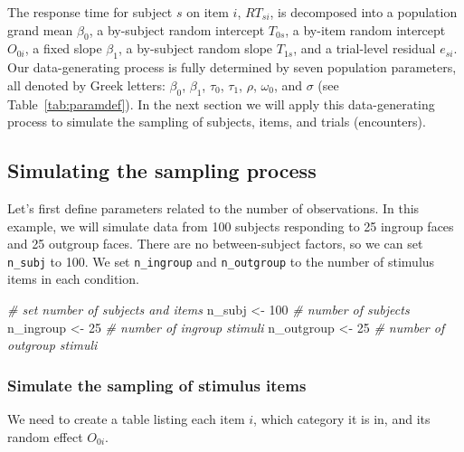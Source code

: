 \documentclass[
  english,
  doc,floatsintext]{apa6}
\newenvironment{Shaded}{\begin{snugshade}}{\end{snugshade}}
\newcommand{\CommentTok}[1]{\textcolor[rgb]{0.56,0.35,0.01}{\textit{#1}}}
\newcommand{\DecValTok}[1]{\textcolor[rgb]{0.00,0.00,0.81}{#1}}
\newcommand{\NormalTok}[1]{#1}
\newcommand{\StringTok}[1]{\textcolor[rgb]{0.31,0.60,0.02}{#1}}
\begin{document}
\noindent The response time for subject \(s\) on item \(i\), \(RT_{si}\), is decomposed into a population grand mean \(\beta_0\), a by-subject random intercept \(T_{0s}\), a by-item random intercept \(O_{0i}\), a fixed slope \(\beta_1\), a by-subject random slope \(T_{1s}\), and a trial-level residual \(e_{si}\). Our data-generating process is fully determined by seven population parameters, all denoted by Greek letters: \(\beta_0\), \(\beta_1\), \(\tau_0\), \(\tau_1\), \(\rho\), \(\omega_0\), and \(\sigma\) (see Table~\ref{tab:paramdef}). In the next section we will apply this data-generating process to simulate the sampling of subjects, items, and trials (encounters).

\hypertarget{simulating-the-sampling-process}{%
\subsection{Simulating the sampling process}\label{simulating-the-sampling-process}}

Let's first define parameters related to the number of observations. In this example, we will simulate data from 100 subjects responding to 25 ingroup faces and 25 outgroup faces. There are no between-subject factors, so we can set \texttt{n\_subj} to 100. We set \texttt{n\_ingroup} and \texttt{n\_outgroup} to the number of stimulus items in each condition.

\begin{Shaded}
\begin{Highlighting}[]
\CommentTok{# set number of subjects and items}
\NormalTok{n_subj     <-}\StringTok{ }\DecValTok{100} \CommentTok{# number of subjects}
\NormalTok{n_ingroup  <-}\StringTok{  }\DecValTok{25} \CommentTok{# number of ingroup stimuli}
\NormalTok{n_outgroup <-}\StringTok{  }\DecValTok{25} \CommentTok{# number of outgroup stimuli}
\end{Highlighting}
\end{Shaded}

\hypertarget{simulate-the-sampling-of-stimulus-items}{%
\subsubsection{Simulate the sampling of stimulus items}\label{simulate-the-sampling-of-stimulus-items}}

We need to create a table listing each item \(i\), which category it is in, and its random effect \(O_{0i}\).
\end{document}
